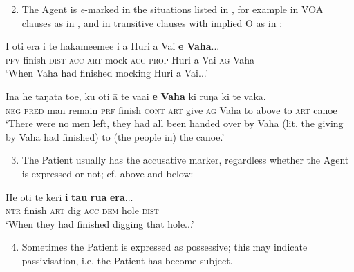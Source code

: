 \begin{enumerate}
\setcounter{enumi}{1}
\item 
The Agent is \textit{e}{}-marked in the situations listed in , for example in VOA clauses as in , and in transitive clauses with implied O as in :
\end{enumerate}

\ea\label{ex:8.164}
\gll I oti era i te hakame{\ꞌ}eme{\ꞌ}e i a Huri {\ꞌ}a Vai \textbf{e} \textbf{Vaha}... \\
\textsc{pfv} finish \textsc{dist} \textsc{acc} \textsc{art} mock \textsc{acc} \textsc{prop} Huri a Vai \textsc{ag} Vaha \\

\glt 
‘When Vaha had finished mocking Huri a Vai...’ \textstyleExampleref{[R304.094]} 
\z

\ea\label{ex:8.165}
\gll {\ꞌ}Ina he taŋata toe, ku oti {\ꞌ}ā te va{\ꞌ}ai \textbf{e} \textbf{Vaha} ki ruŋa ki te vaka. \\
\textsc{neg} \textsc{pred} man remain \textsc{prf} finish \textsc{cont} \textsc{art} give \textsc{ag} Vaha to above to \textsc{art} canoe \\

\glt
‘There were no men left, they had all been handed over by Vaha (lit. the giving by Vaha had finished) to (the people in) the canoe.’ \textstyleExampleref{[Mtx-3-01.122]}
\z

\begin{enumerate}
\setcounter{enumi}{2}
\item 
The Patient usually has the accusative marker, regardless whether the Agent is expressed or not; cf.  above and  below:
\end{enumerate}
\ea\label{ex:8.166}
\gll He oti te keri \textbf{i} \textbf{tau} \textbf{rua} \textbf{era}... \\
\textsc{ntr} finish \textsc{art} dig \textsc{acc} \textsc{dem} hole \textsc{dist} \\

\glt
‘When they had finished digging that hole...’ \textstyleExampleref{[Mtx-3-02.010]}
\z

\begin{enumerate}
\setcounter{enumi}{3}
\item 
{}Sometimes the Patient is expressed as possessive; this may indicate passivisation, i.e. the Patient has become subject. 
\end{enumerate}

